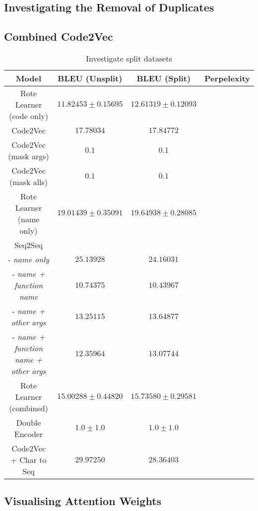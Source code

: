 \subsection{Investigating the Removal of Duplicates} %
\label{sub:investigating_the_removal_of_duplicates}

\subsection{Combined Code2Vec } %
\label{sub:combined_code2vec}


\begin{table}[h!]
\begin{center}
\begin{tabular}{ c | c | c | c }
    Model                             & BLEU (Unsplit)  & BLEU (Split)    & Perpelexity \\
    \hline
    Rote Learner  (code only)         & $ 11.82453 \pm  0.15695 $ & $ 12.61319 \pm 0.12093 $ & \\
    Code2Vec                          & $ 17.78034 $ & $ 17.84772 $ & \\
    Code2Vec  (mask args)             & $ 0.1 $ & $ 0.1$ & \\
    Code2Vec  (mask alls)             & $ 0.1 $ & $ 0.1 $ & \\
    \hline
    \hline
    Rote Learner  (name only)         & $ 19.01439 \pm  0.35091 $ & $ 19.64938 \pm 0.28085 $ & \\
    \hline
    Seq2Seq                             & &  & \\
     - \textit{name only}               & $ 25.13928 $ & $ 24.16031 $ & \\
    - \textit{name + function name}     & $ 10.74375 $ & $ 10.43967 $  \\

    - \textit{name + other args}        & $ 13.25115 $ & $ 13.64877 $  \\

    - \textit{name + function name + other args}    & $ 12.35964 $ & $ 13.07744 $  \\
    \hline
    \hline
    Rote Learner (combined)            & $ 15.00288 \pm  0.44820 $ & $ 15.73580 \pm 0.29581 $ & \\
    Double Encoder                    & $1.0 \pm 1.0 $  & $1.0 \pm 1.0 $  &  \\
    Code2Vec  + Char to Seq           & $ 29.97250 $ & $ 28.36403 $ & \\
    \hline
\end{tabular}
\caption {Investigate split datasets}
\label{table:split_datasets_embed}
\end{center}
\end{table}


\subsection{Visualising Attention Weights} %
\label{sub:visualising_attention_weights}

